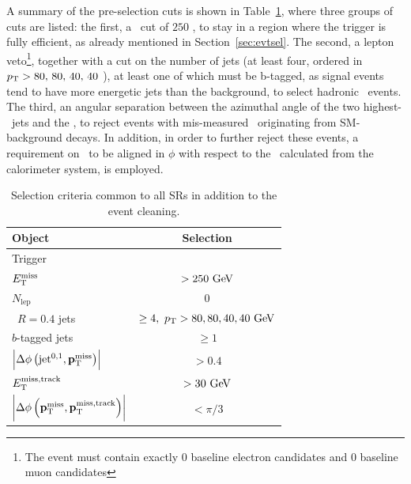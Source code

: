 			A summary of the pre-selection cuts is shown in Table~\ref{tab:SRcommon}, where three groups of cuts are listed: the first, a \met\ cut of $250$ \GeV, to stay in a region where the trigger is fully efficient, as already mentioned in Section~\ref{sec:evtsel}. The second, a lepton veto\footnote{The event must contain exactly $0$ baseline electron candidates and $0$ baseline muon candidates}, together with a cut on the number of jets (at least four, ordered in $p_{\mathrm{T}} > 80,\,80,\,40,\,40$ \GeV), at least one of which must be b-tagged, as signal events tend to have more energetic jets than the background, to select hadronic \ttbar\ events. The third, an angular separation between the azimuthal angle of the two highest-\pt\ jets and the \ptmiss, to reject events with mis-measured \met\ originating from \ac{SM}-background decays. In addition, in order to further reject these events, a requirement on \ptmisstrk\ to be aligned in $\phi$ with respect to the \ptmiss\ calculated from the calorimeter system, is employed. 

			\begin{table}[htbp]
			\caption{Selection criteria common to all \acp{SR} in addition to the event cleaning.}
				\begin{center}
				\renewcommand{\arraystretch}{1.4}
				    \begin{tabular}{lc} 
				    	\toprule
				    	\textbf{Object} & \textbf{Selection} \\
				    	\toprule
				    	Trigger & \met \\ 
					   $E_{\mathrm{T}}^{\mathrm{miss}}$ & $> 250\GeV$ \\ 
					   \midrule
					   $N_{\mathrm{lep}}$ & $0$ \\ 
					   \antikt\ $R=0.4$ jets & $\ge 4,~\pt>80,80,40,40 \gev$ \\ 
					   $b$-tagged jets & $\ge1$ \\ \midrule
					   $\left|\Delta\phi\left(\mathrm{jet}^{0,1},\mathbf{p}_\mathrm{T}^\mathrm{miss}\right)\right|$ & $> 0.4$ \\ 
					   $E_{\mathrm{T}}^{\mathrm{miss, track}}$  & $> 30 \gev$ \\  
					   $\left|\Delta\phi\left(\mathbf{p}_\mathrm{T}^\mathrm{miss},\mathbf{p}_{\mathrm{T}}^{\mathrm{miss, track}}\right)\right|$ & $<\pi/3$ \\
					   \bottomrule
				    \end{tabular}
					\end{center}
			\label{tab:SRcommon}
			\end{table}

